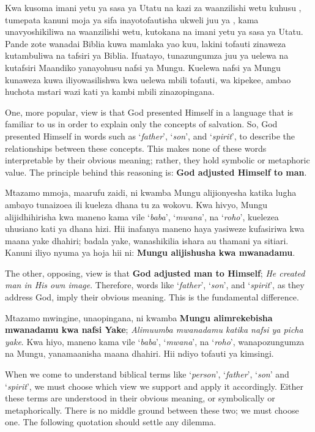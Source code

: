 Kwa kusoma imani yetu ya sasa ya Utatu na kazi za waanzilishi wetu kuhusu , tumepata kanuni moja ya sifa inayotofautisha ukweli juu ya , kama unavyoshikiliwa na waanzilishi wetu, kutokana na imani yetu ya sasa ya Utatu. Pande zote wanadai Biblia kuwa mamlaka yao kuu, lakini tofauti zinaweza kutambuliwa na tafsiri ya Biblia. Ifuatayo, tunazungumza juu ya uelewa na kutafsiri Maandiko yanayohusu nafsi ya Mungu. Kuelewa nafsi ya Mungu kunaweza kuwa iliyowasilishwa kwa uelewa mbili tofauti, wa kipekee, ambao huchota mstari wazi kati ya kambi mbili zinazopingana.


One, more popular, view is that God presented Himself in a language that is familiar to us in order to explain only the concepts of salvation. So, God presented Himself in words such as ‘\textit{father}’, ‘\textit{son}’, and ‘\textit{spirit}’, to describe the relationships between these concepts. This makes none of these words interpretable by their obvious meaning; rather, they hold symbolic or metaphoric value. The principle behind this reasoning is: \textbf{God adjusted Himself to man}.


Mtazamo mmoja, maarufu zaidi, ni kwamba Mungu alijionyesha katika lugha ambayo tunaizoea ili kueleza dhana tu za wokovu. Kwa hivyo, Mungu alijidhihirisha kwa maneno kama vile ‘\textit{baba}’, ‘\textit{mwana}’, na ‘\textit{roho}’, kuelezea uhusiano kati ya dhana hizi. Hii inafanya maneno haya yasiweze kufasiriwa kwa maana yake dhahiri; badala yake, wanashikilia ishara au thamani ya sitiari. Kanuni iliyo nyuma ya hoja hii ni: \textbf{Mungu alijishusha kwa mwanadamu}.


The other, opposing, view is that \textbf{God adjusted man to Himself}; \textit{He created man in His own image}. Therefore, words like ‘\textit{father}’, ‘\textit{son}’, and ‘\textit{spirit}’, as they address God, imply their obvious meaning. This is the fundamental difference.


Mtazamo mwingine, unaopingana, ni kwamba \textbf{Mungu alimrekebisha mwanadamu kwa nafsi Yake}; \textit{Alimuumba mwanadamu katika nafsi ya picha yake}. Kwa hiyo, maneno kama vile ‘\textit{baba}’, ‘\textit{mwana}’, na ‘\textit{roho}’, wanapozungumza na Mungu, yanamaanisha maana dhahiri. Hii ndiyo tofauti ya kimsingi.


When we come to understand biblical terms like ‘\textit{person}’, ‘\textit{father}’, ‘\textit{son}’ and ‘\textit{spirit}’, we must choose which view we support and apply it accordingly. Either these terms are understood in their obvious meaning, or symbolically or metaphorically. There is no middle ground between these two; we must choose one. The following quotation should settle any dilemma.


